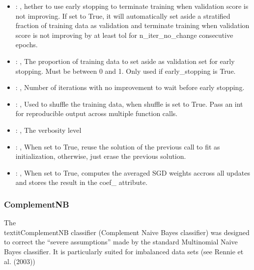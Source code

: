 \begin{itemize}
    \item {}: , 
      hether to use early stopping to terminate training when validation score is not
      improving. If set to True, it will automatically set aside a stratified fraction of training
      data as validation and terminate training when validation score is not improving by at least
      tol for n\_iter\_no\_change consecutive epochs.

    \item {}: , 
      The proportion of training data to set aside as validation set for early stopping.
      Must be between 0 and 1. Only used if early\_stopping is True.

    \item {}: , 
      Number of iterations with no improvement to wait before early stopping.

    \item {}: , 
      Used to shuffle the training data, when shuffle is set to
      True. Pass an int for reproducible output across multiple function calls.

    \item {}: , 
      The verbosity level

    \item {}: , 
      When set to True, reuse the solution of the previous call
      to fit as initialization, otherwise, just erase the previous solution.

    \item {}: , 
      When set to True, computes the averaged SGD weights accross
      all updates and stores the result in the coef\_ attribute.
  \end{itemize}


\subsubsection{ComplementNB}
  The \\textit{ComplementNB} classifier (Complement Naive Bayes classifier) was designed to correct
  the ``severe assumptions'' made by the standard Multinomial Naive Bayes classifier.
  It is particularly suited for imbalanced data sets (see Rennie et al. (2003))

